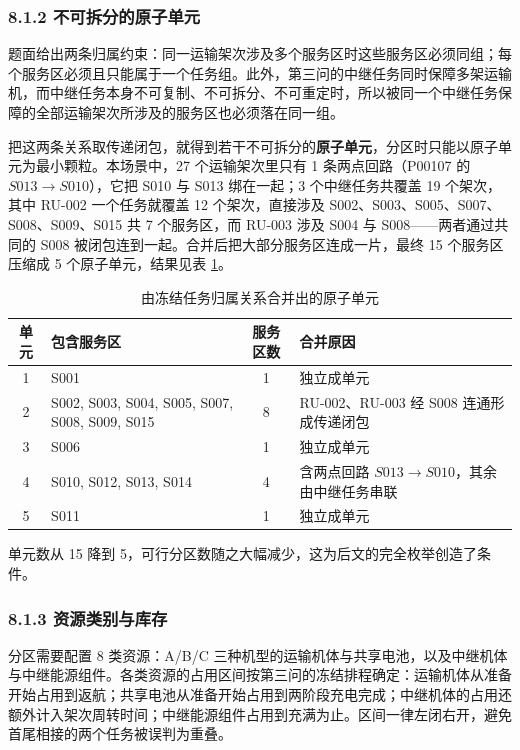 \documentclass[withoutpreface,bwprint]{format}
\begin{document}
\subsubsection{8.1.2 不可拆分的原子单元}
题面给出两条归属约束：同一运输架次涉及多个服务区时这些服务区必须同组；每个服务区必须且只能属于一个任务组。此外，第三问的中继任务同时保障多架运输机，而中继任务本身不可复制、不可拆分、不可重定时，所以被同一个中继任务保障的全部运输架次所涉及的服务区也必须落在同一组。

把这两条关系取传递闭包，就得到若干不可拆分的\textbf{原子单元}，分区时只能以原子单元为最小颗粒。本场景中，27 个运输架次里只有 1 条两点回路（P00107 的 $S013 \to S010$），它把 S010 与 S013 绑在一起；3 个中继任务共覆盖 19 个架次，其中 RU-002 一个任务就覆盖 12 个架次，直接涉及 S002、S003、S005、S007、S008、S009、S015 共 7 个服务区，而 RU-003 涉及 S004 与 S008——两者通过共同的 S008 被闭包连到一起。合并后把大部分服务区连成一片，最终 15 个服务区压缩成 5 个原子单元，结果见表 \ref{tab:q4_units}。

\begin{table}[H]
\centering
\small
\caption{由冻结任务归属关系合并出的原子单元}
\label{tab:q4_units}
\begin{tabularx}{\textwidth}{c l c >{\raggedright\arraybackslash}X}
\toprule
\textbf{单元} & \textbf{包含服务区} & \textbf{服务区数} & \textbf{合并原因} \\
\midrule
1 & S001 & 1 & 独立成单元 \\
2 & S002, S003, S004, S005, S007, S008, S009, S015 & 8 & RU-002、RU-003 经 S008 连通形成传递闭包 \\
3 & S006 & 1 & 独立成单元 \\
4 & S010, S012, S013, S014 & 4 & 含两点回路 $S013 \to S010$，其余由中继任务串联 \\
5 & S011 & 1 & 独立成单元 \\
\bottomrule
\end{tabularx}
\end{table}

单元数从 15 降到 5，可行分区数随之大幅减少，这为后文的完全枚举创造了条件。

\subsubsection{8.1.3 资源类别与库存}
分区需要配置 8 类资源：A/B/C 三种机型的运输机体与共享电池，以及中继机体与中继能源组件。各类资源的占用区间按第三问的冻结排程确定：运输机体从准备开始占用到返航；共享电池从准备开始占用到两阶段充电完成；中继机体的占用还额外计入架次周转时间；中继能源组件占用到充满为止。区间一律左闭右开，避免首尾相接的两个任务被误判为重叠。
\end{document}
